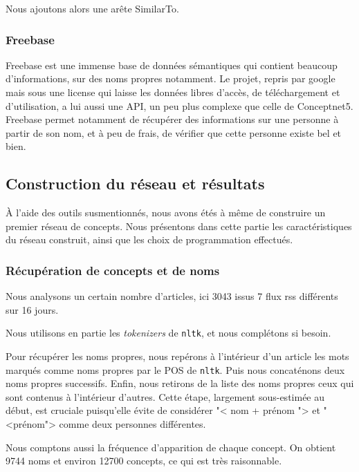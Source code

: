 \documentclass[a4paper,12pt]{article}
\newcommand{\pyt}[1]{\texttt{#1}}
\newcommand{\ang}[1]{\textit{#1}}%
\begin{document}
Nous ajoutons alors une arête SimilarTo.
    
\subsubsection{Freebase}

Freebase est une immense base de données sémantiques qui contient beaucoup d'informations, sur des noms propres notamment. Le projet, repris par google mais sous une license qui laisse les données libres d'accès, de téléchargement et d'utilisation, a lui aussi une API, un peu plus complexe que celle de Conceptnet5. Freebase permet notamment de récup\'erer des informations sur une personne à partir de son nom, et à peu de frais, de vérifier que cette personne existe bel et bien.


\subsection{Construction du r\'eseau et r\'esultats}

\`A l'aide des outils susmentionn\'es, nous avons \'et\'es \`a m\^eme de construire un premier r\'eseau de concepts.
Nous pr\'esentons dans cette partie les caract\'eristiques du r\'eseau construit, ainsi que les choix de programmation effectu\'es.

\subsubsection{R\'ecup\'eration de concepts et de noms}

Nous analysons un certain nombre d'articles, ici 3043 issus 7 flux rss diff\'erents sur 16 jours.

Nous utilisons en partie les \ang{tokenizers} de \pyt{nltk}, et nous compl\'etons si besoin.

Pour r\'ecup\'erer les noms propres, nous rep\'erons \`a l'int\'erieur d'un article les mots marqu\'es comme noms propres par le POS de \pyt{nltk}. Puis nous concat\'enons deux noms propres successifs. Enfin, nous retirons de la liste des noms propres ceux qui sont contenus \`a l'int\'erieur d'autres. Cette \'etape, largement sous-estim\'ee au d\'ebut, est cruciale puisqu'elle \'evite de consid\'erer "< nom + pr\'enom "> et "<pr\'enom"> comme deux personnes diff\'erentes.

Nous comptons aussi la fr\'equence d'apparition de chaque concept. On obtient 9744 noms et environ 12700 concepts, ce qui est tr\`es raisonnable.
\end{document}
